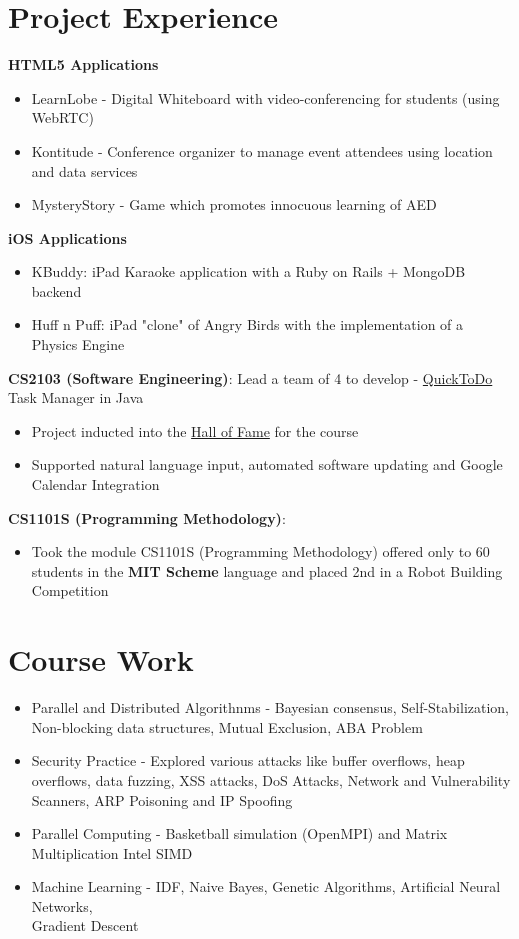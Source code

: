 \documentclass[11pt,a4paper]{moderncv}
\begin{document}
\section{Project Experience}
\textbf{HTML5 Applications}
\begin{itemize}
    \item LearnLobe - Digital Whiteboard with video-conferencing for students (using WebRTC)
    \item Kontitude - Conference organizer to manage event attendees using location and data services
    \item MysteryStory - Game which promotes innocuous learning of AED
\end{itemize}
\textbf{iOS Applications}
\begin{itemize}
     \item KBuddy: iPad Karaoke application with a Ruby on Rails + MongoDB backend
     \item Huff n Puff: iPad "clone" of Angry Birds with the implementation of a Physics Engine
\end{itemize}
\textbf{CS2103 (Software Engineering)}: Lead a team of 4 to develop - \href{http://github.com/vellvisher/quicktodo}{QuickToDo} Task Manager in Java
 \begin{itemize}
     \item Project inducted into the \href{http://www.comp.nus.edu.sg/~cs2103/AY1112S1projects/halloffame.html}{Hall of Fame}
         for the course
     \item Supported natural language input, automated software updating and Google Calendar Integration
 \end{itemize}
 \textbf{CS1101S (Programming Methodology)}:
 \begin{itemize}
    \item Took the module CS1101S (Programming Methodology) offered only
        to 60 students in the \textbf{MIT Scheme} language and placed 2nd in a Robot Building Competition
 \end{itemize}
\section{Course Work}
{\begin{itemize}
        \item Parallel and Distributed Algorithnms - Bayesian consensus, Self-Stabilization, Non-blocking data structures,
            Mutual Exclusion, ABA Problem
 \item Security Practice - Explored various attacks like buffer overflows,
     heap overflows, data fuzzing, XSS attacks, DoS Attacks, Network and Vulnerability Scanners,
     ARP Poisoning and IP Spoofing
 \item Parallel Computing - Basketball simulation (OpenMPI) and Matrix Multiplication Intel SIMD
 \item Machine Learning - IDF, Naive Bayes, Genetic Algorithms, Artificial Neural Networks,\\ Gradient Descent
 \end{itemize}}
\end{document}
